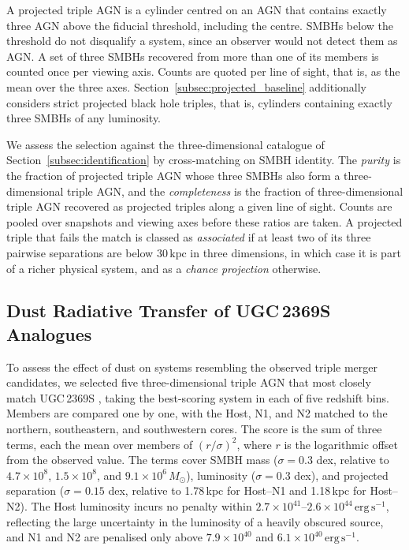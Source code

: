 \documentclass[twocolumn, 10pt]{article}
\begin{document}
A projected triple AGN is a cylinder centred on an AGN that contains exactly three AGN above the fiducial threshold, including the centre. SMBHs below the threshold do not disqualify a system, since an observer would not detect them as AGN. A set of three SMBHs recovered from more than one of its members is counted once per viewing axis. Counts are quoted per line of sight, that is, as the mean over the three axes. Section~\ref{subsec:projected_baseline} additionally considers strict projected black hole triples, that is, cylinders containing exactly three SMBHs of any luminosity.

We assess the selection against the three-dimensional catalogue of Section~\ref{subsec:identification} by cross-matching on SMBH identity. The \textit{purity} is the fraction of projected triple AGN whose three SMBHs also form a three-dimensional triple AGN, and the \textit{completeness} is the fraction of three-dimensional triple AGN recovered as projected triples along a given line of sight. Counts are pooled over snapshots and viewing axes before these ratios are taken. A projected triple that fails the match is classed as \textit{associated} if at least two of its three pairwise separations are below $30\,\mathrm{kpc}$ in three dimensions, in which case it is part of a richer physical system, and as a \textit{chance projection} otherwise.

\subsection{Dust Radiative Transfer of UGC\,2369S Analogues}
\label{subsec:rt_methods}

To assess the effect of dust on systems resembling the observed triple merger candidates, we selected five three-dimensional triple AGN that most closely match UGC\,2369S \citep{Ding2025}, taking the best-scoring system in each of five redshift bins. Members are compared one by one, with the Host, N1, and N2 matched to the northern, southeastern, and southwestern cores. The score is the sum of three terms, each the mean over members of $(r/\sigma)^2$, where $r$ is the logarithmic offset from the observed value. The terms cover SMBH mass ($\sigma = 0.3$ dex, relative to $4.7 \times 10^8$, $1.5 \times 10^8$, and $9.1 \times 10^6\,M_\odot$), luminosity ($\sigma = 0.3$ dex), and projected separation ($\sigma = 0.15$ dex, relative to 1.78\,kpc for Host--N1 and 1.18\,kpc for Host--N2). The Host luminosity incurs no penalty within $2.7 \times 10^{41}$--$2.6 \times 10^{44}\,\mathrm{erg\,s^{-1}}$, reflecting the large uncertainty in the luminosity of a heavily obscured source, and N1 and N2 are penalised only above $7.9 \times 10^{40}$ and $6.1 \times 10^{40}\,\mathrm{erg\,s^{-1}}$.
\end{document}
